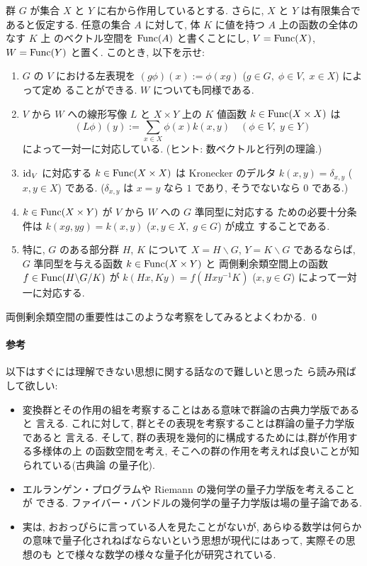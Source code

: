 \documentclass[12pt,twoside]{jarticle}
\def\Func{\mathop{\text{\rm Func}}\nolimits}
\def\id{\text{\rm id}}
\begin{document}
\begin{question}[群の作用の量子化]
  群 $G$ が集合 $X$ と $Y$ に右から作用しているとする.
  さらに, $X$ と $Y$ は有限集合であると仮定する. 
  任意の集合 $A$ に対して, 体 $K$ に値を持つ $A$ 上の函数の全体のなす $K$ 上
  のベクトル空間を $\Func(A)$ と書くことにし, 
  $V = \Func(X)$, $W = \Func(Y)$ と置く.
  このとき, 以下を示せ:
  \begin{enumerate}
  \item $G$ の $V$ における左表現を %
    $(g\phi)(x) := \phi(xg)$ ($g\in G,\; \phi\in V,\; x\in X$) によって定め
    ることができる.  $W$ についても同様である.
  \item $V$ から $W$ への線形写像 $L$ と %
    $X\times Y$ 上の $K$ 値函数 $k\in\Func(X\times X)$ は
    \begin{equation*}
      (L\phi)(y) := \sum_{x\in X} \phi(x) k(x,y) \quad
      (\phi\in V,\; y\in Y)
    \end{equation*}
    によって一対一に対応している. (ヒント: 数ベクトルと行列の理論.)
  \item $\id_V$ に対応する $k\in\Func(X\times X)$ は Kronecker のデルタ %
    $k(x,y) = \delta_{x,y}$ ($x,y\in X$) である.
    ($\delta_{x,y}$ は $x=y$ なら $1$ であり, そうでないなら $0$ である.)
  \item $k\in\Func(X\times Y)$ が $V$ から $W$ への $G$ 準同型に対応する
    ための必要十分条件は $k(xg, yg) = k(x,y)$ ($x,y\in X,\; g\in G$) が成立
    することである.
  \item 特に, $G$ のある部分群 $H$, $K$ について %
    $X=H\backslash G$, $Y=K\backslash G$ であるならば,
    $G$ 準同型を与える函数 $k\in\Func(X\times Y)$ と %
    両側剰余類空間上の函数 $f\in\Func(H\backslash G/K)$ が %
    $k(Hx,Ky) = f(Hxy^{-1}K)$ ($x,y\in G$) によって一対一に対応する.
  \end{enumerate}
  両側剰余類空間の重要性はこのような考察をしてみるとよくわかる.
  \qed
\end{question}

\paragraph{参考} 以下はすぐには理解できない思想に関する話なので難しいと思った
ら読み飛ばして欲しい:
\begin{itemize}
\item 変換群とその作用の組を考察することはある意味で群論の古典力学版であると
  言える. これに対して, 群とその表現を考察することは群論の量子力学版であると
  言える. そして, 群の表現を幾何的に構成するためには,群が作用する多様体の上
  の函数空間を考え, そこへの群の作用を考えれば良いことが知られている(古典論
  の量子化). 
\item エルランゲン・プログラムや Riemann の幾何学の量子力学版を考えることが
  できる. ファイバー・バンドルの幾何学の量子力学版は場の量子論である.
\item 実は, おおっぴらに言っている人を見たことがないが, あらゆる数学は何らか
  の意味で量子化されねばならないという思想が現代にはあって, 実際その思想のも
  とで様々な数学の様々な量子化が研究されている.
\end{itemize}
\end{document}
